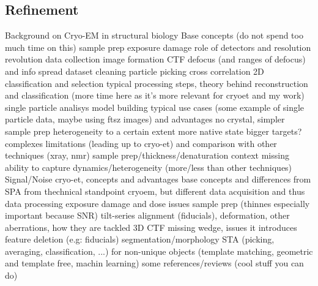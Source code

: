 \subsection{Refinement}\label{et_refinement}

\newpage

\FloatBarrier

\begin{outline}
\1 Background on Cryo-EM in structural biology
    \2 \tick Base concepts (do not spend too much time on this)
        \3 \tick sample prep
        \3 \tick exposure damage
        \3 \tick role of detectors and resolution revolution \cite{faruqiCCDDetectorsHighresolution2000}
        \3 \tick data collection
        \3 \tick image formation
        \3 \tick CTF
        \3 \tick defocus (and ranges of defocus) and info spread
        \3 \tick dataset cleaning
        \3 \tick particle picking
        \3 \tick cross correlation
        \3 \tick 2D classification and selection
        \3 \tick typical processing steps, theory behind reconstruction and classification (more time here as it's more relevant for cryoet and my work)
        \3 \tick single particle analisys
        \3 \tick model building
    \2 \tick typical use cases (some example of single particle data, maybe using ftsz images) and advantages
        \3 \tick no crystal, simpler sample prep
        \3 \tick heterogeneity to a certain extent
        \3 \tick more native state
        \3 \tick bigger targets? complexes
    \2 \tick limitations (leading up to cryo-et) and comparison with other techniques (xray, nmr)
        \3 \tick sample prep/thickness/denaturation
        \3 \tick context missing
        \3 \tick ability to capture dynamics/heterogeneity (more/less than other techniques)
        \3 \tick Signal/Noise
\1 cryo-et, concepts and advantages
    \2 base concepts and differences from SPA from thechnical standpoint
        \2 \tick cryoem, but different data acquisition and thus data processing
        \3 \tick exposure damage and dose issues
        \3 \tick sample prep (thinnes especially important because SNR)
        \3 \tick tilt-series alignment (fiducials), deformation, other aberrations, how they are tackled
        \3 3D CTF
        \3 missing wedge, issues it introduces
        \3 feature deletion (e.g: fiducials)
        \3 segmentation/morphology
        \3 STA (picking, averaging, classification, ...) for non-unique objects (template matching, geometric and template free, machin learning)
    \2 some references/reviews (cool stuff you can do)
        \3 \cite{turkPromiseChallengesCryoelectron2020,lucicCryoelectronTomographyChallenge2013}

\end{outline}
